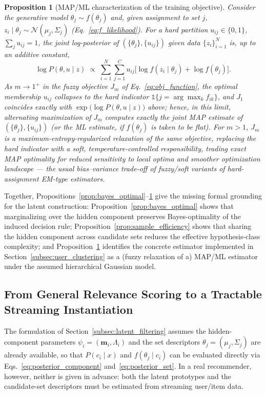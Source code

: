 \documentclass{article}
\theoremstyle{plain}
\newtheorem{proposition}{Proposition}
\theoremstyle{definition}
\theoremstyle{remark}
\begin{document}
\begin{proposition}[MAP/ML characterization of the training objective]
	\label{prop:map_ml}
	Consider the generative model $\theta_j \sim f(\theta_j)$ and, given assignment to set $j$, $z_i \mid \theta_j \sim \mathcal N(\mu_j,\Sigma_j)$ (Eq.~\eqref{eq:f_likelihood}). For a hard partition $u_{ij}\in\{0,1\}$, $\sum_j u_{ij}=1$, the joint log-posterior of $(\{\theta_j\},\{u_{ij}\})$ given data $\{z_i\}_{i=1}^N$ is, up to an additive constant,
	\[
	\log P(\theta,u\mid z) \;\propto\; \sum_{i=1}^N\sum_{j=1}^C u_{ij}\Big[\log f(z_i\mid \theta_j) + \log f(\theta_j)\Big].
	\]
	As $m\to 1^+$ in the fuzzy objective $J_m$ of Eq.~\eqref{eq:obj_function}, the optimal membership $u_{ij}$ collapses to the hard indicator $\mathbb{1}\{j=\arg\max_k f_{ik}\}$, and $J_1$ coincides exactly with $\exp\big(\log P(\theta,u\mid z)\big)$ above; hence, in this limit, alternating maximization of $J_m$ computes exactly the joint MAP estimate of $(\{\theta_j\},\{u_{ij}\})$ (or the ML estimate, if $f(\theta_j)$ is taken to be flat). For $m>1$, $J_m$ is a maximum-entropy-regularized relaxation of the same objective, replacing the hard indicator with a soft, temperature-controlled responsibility, trading exact MAP optimality for reduced sensitivity to local optima and smoother optimization landscape — the usual bias–variance trade-off of fuzzy/soft variants of hard-assignment EM-type estimators.
\end{proposition}

Together, Propositions~\ref{prop:bayes_optimal}--\ref{prop:map_ml} give the missing formal grounding for the latent construction: Proposition~\ref{prop:bayes_optimal} shows that marginalizing over the hidden component preserves Bayes-optimality of the induced decision rule; Proposition~\ref{prop:sample_efficiency} shows that sharing the hidden component across candidate sets reduces the effective hypothesis-class complexity; and Proposition~\ref{prop:map_ml} identifies the concrete estimator implemented in Section~\ref{subsec:user_clustering} as a (fuzzy relaxation of a) MAP/ML estimator under the assumed hierarchical Gaussian model.

\subsection{From General Relevance Scoring to a Tractable Streaming Instantiation}
\label{subsec:bridge}

The formulation of Section~\ref{subsec:latent_filtering} assumes the hidden-component parameters $\psi_i = (\mathbf{m}_i, \Lambda_i)$ and the set descriptors $\theta_j = (\mu_j, \Sigma_j)$ are already available, so that $P(c_i \mid x)$ and $f(\theta_j \mid c_i)$ can be evaluated directly via Eqs.~\eqref{eq:posterior_component} and~\eqref{eq:posterior_set}. In a real recommender, however, neither is given in advance: both the latent prototypes and the candidate-set descriptors must be estimated from streaming user/item data.
\end{document}
